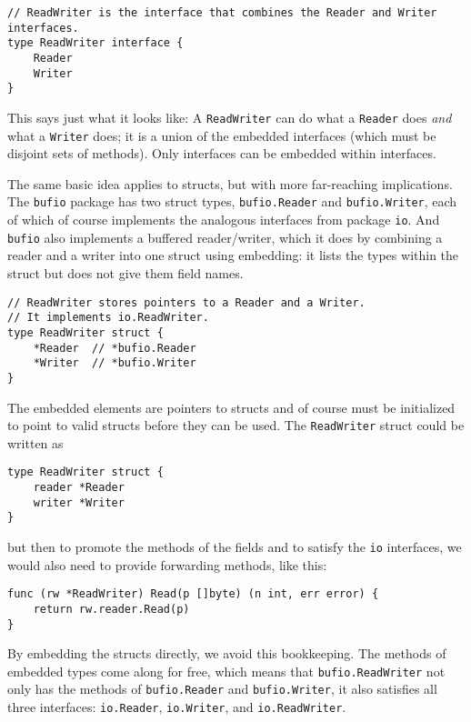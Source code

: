 \begin{Verbatim}[frame=single]
// ReadWriter is the interface that combines the Reader and Writer interfaces.
type ReadWriter interface {
    Reader
    Writer
}
\end{Verbatim}

This says just what it looks like: A \texttt{ReadWriter} can do what a
\texttt{Reader} does \emph{and} what a \texttt{Writer} does; it is a
union of the embedded interfaces (which must be disjoint sets of
methods). Only interfaces can be embedded within interfaces.

The same basic idea applies to structs, but with more far-reaching
implications. The \texttt{bufio} package has two struct types,
\texttt{bufio.Reader} and \texttt{bufio.Writer}, each of which of course
implements the analogous interfaces from package \texttt{io}. And
\texttt{bufio} also implements a buffered reader/writer, which it does
by combining a reader and a writer into one struct using embedding: it
lists the types within the struct but does not give them field names.

\begin{Verbatim}[frame=single]
// ReadWriter stores pointers to a Reader and a Writer.
// It implements io.ReadWriter.
type ReadWriter struct {
    *Reader  // *bufio.Reader
    *Writer  // *bufio.Writer
}
\end{Verbatim}

The embedded elements are pointers to structs and of course must be
initialized to point to valid structs before they can be used. The
\texttt{ReadWriter} struct could be written as

\begin{Verbatim}[frame=single]
type ReadWriter struct {
    reader *Reader
    writer *Writer
}
\end{Verbatim}

but then to promote the methods of the fields and to satisfy the
\texttt{io} interfaces, we would also need to provide forwarding
methods, like this:

\begin{Verbatim}[frame=single]
func (rw *ReadWriter) Read(p []byte) (n int, err error) {
    return rw.reader.Read(p)
}
\end{Verbatim}

By embedding the structs directly, we avoid this bookkeeping. The
methods of embedded types come along for free, which means that
\texttt{bufio.ReadWriter} not only has the methods of
\texttt{bufio.Reader} and \texttt{bufio.Writer}, it also satisfies all
three interfaces: \texttt{io.Reader}, \texttt{io.Writer}, and
\texttt{io.ReadWriter}.

